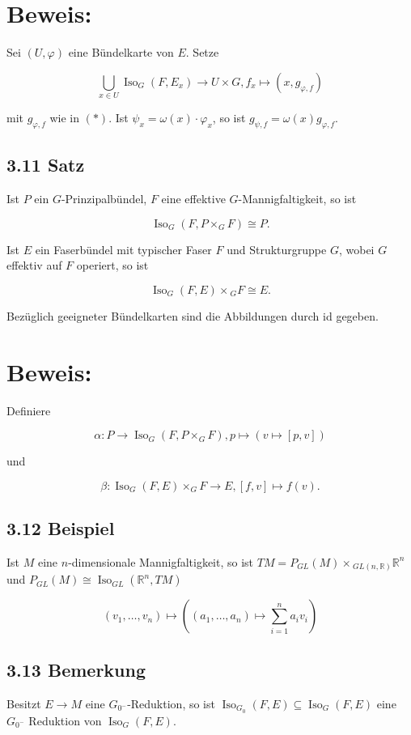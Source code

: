 \documentclass[10pt, letterpaper]{article}
\begin{document}
\section*{Beweis:}
Sei $(U, \varphi)$ eine Bündelkarte von $E$. Setze

$$
\bigcup_{x \in U} \operatorname{Iso}_{G}\left(F, E_{x}\right) \rightarrow U \times G, f_{x} \mapsto\left(x, g_{\varphi, f}\right)
$$

mit $g_{\varphi, f}$ wie in $(*)$. Ist $\psi_{x}=\omega(x) \cdot \varphi_{x}$, so ist $g_{\psi, f}=\omega(x) g_{\varphi, f}$.

\subsection*{3.11 Satz}
Ist $P$ ein $G$-Prinzipalbündel, $F$ eine effektive $G$-Mannigfaltigkeit, so ist

$$
\operatorname{Iso}_{G}\left(F, P \times_{G} F\right) \cong P .
$$

Ist $E$ ein Faserbündel mit typischer Faser $F$ und Strukturgruppe $G$, wobei $G$ effektiv auf $F$ operiert, so ist

$$
\operatorname{Iso}_{G}(F, E) \times{ }_{G} F \cong E .
$$

Bezüglich geeigneter Bündelkarten sind die Abbildungen durch id gegeben.

\section*{Beweis:}
Definiere

$$
\alpha: P \rightarrow \operatorname{Iso}_{G}\left(F, P \times_{G} F\right), p \mapsto(v \mapsto[p, v])
$$

und

$$
\beta: \operatorname{Iso}_{G}(F, E) \times_{G} F \rightarrow E,[f, v] \mapsto f(v) .
$$

\subsection*{3.12 Beispiel}
Ist $M$ eine $n$-dimensionale Mannigfaltigkeit, so ist $T M=P_{G L}(M) \times{ }_{G L(n, \mathbb{R})} \mathbb{R}^{n}$ und $P_{G L}(M) \cong \operatorname{Iso}_{G L}\left(\mathbb{R}^{n}, T M\right)$

$$
\left(v_{1}, \ldots, v_{n}\right) \mapsto\left(\left(a_{1}, \ldots, a_{n}\right) \mapsto \sum_{i=1}^{n} a_{i} v_{i}\right)
$$

\subsection*{3.13 Bemerkung}
Besitzt $E \rightarrow M$ eine $G_{0^{-}}$-Reduktion, so ist $\operatorname{Iso}_{G_{0}}(F, E) \subseteq \operatorname{Iso}_{G}(F, E)$ eine $G_{0^{-}}$ Reduktion von $\operatorname{Iso}_{G}(F, E)$.
\end{document}

